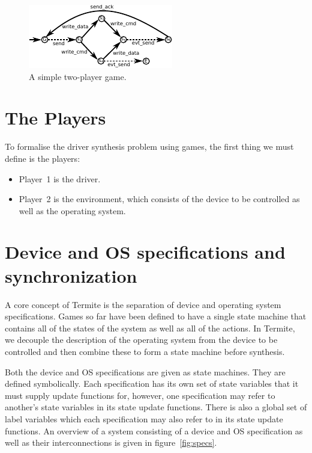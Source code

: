 \begin{figure}[t]
    \center
    \includegraphics[width=0.7\linewidth]{imgs/game.pdf}
    \caption{A simple two-player game.}
    \label{f:game}
\end{figure}

\section{The Players}

To formalise the driver synthesis problem using games, the first thing we must define is the players:

\begin{itemize}
    \item Player~1 is the driver. 
    \item Player~2 is the environment, which consists of the device to be controlled as well as the operating system.
\end{itemize}

\section{Device and OS specifications and synchronization}

A core concept of Termite is the separation of device and operating system specifications. Games so far have been defined to have a single state machine that contains all of the states of the system as well as all of the actions. In Termite, we decouple the description of the operating system from the device to be controlled and then combine these to form a state machine before synthesis.

Both the device and OS specifications are given as state machines. They are defined symbolically. Each specification has its own set of state variables that it must supply update functions for, however, one specification may refer to another's state variables in its state update functions. There is also a global set of label variables which each specification may also refer to in its state update functions. An overview of a system consisting of a device and OS specification as well as their interconnections is given in figure~\ref{fig:specs}.

